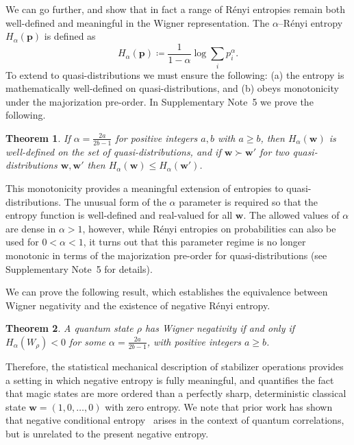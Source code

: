 \documentclass[
onecolumn,
superscriptaddress
]{revtex4-1}
\newtheorem{theorem}{Theorem}
\def\w{\boldsymbol{w}}
\def\p{\boldsymbol{p}}
\begin{document}
We can go further, and show that in fact a range of R\'{e}nyi entropies remain both well-defined and meaningful in the Wigner representation. The $\alpha$--R\'{e}nyi entropy $H_\alpha(\p)$ is defined as~\cite{renyi_1960}
\begin{equation}\label{eq:H}
	H_\alpha(\p) \coloneqq \frac{1}{1-\alpha} \log \sum_i p_i^\alpha.
\end{equation}
To extend to quasi-distributions we must ensure the following: (a) the entropy is mathematically well-defined on quasi-distributions, and (b) obeys monotonicity under the majorization pre-order. In Supplementary Note~5 we prove the following.
\begin{theorem}\label{thm:HSchur} 
	If $\alpha = \frac{2a}{2b-1}$ for positive integers $a,b$ with $a \geq b$, then $H_\alpha(\w)$ is well-defined on the set of quasi-distributions, and if $\w \succ \w'$ for two quasi-distributions $\w, \w'$ then $H_\alpha (\w) \leq H_\alpha(\w')$.
\end{theorem}
This monotonicity provides a meaningful extension of entropies to quasi-distributions. The unusual form of the $\alpha$ parameter is required so that the entropy function is well-defined and real-valued for all $\w$. The allowed values of $\alpha$ are dense in $\alpha >1$, however, while R\'{e}nyi entropies on probabilities can also be used for $0 < \alpha <1$, it turns out that this parameter regime is no longer monotonic in terms of the majorization pre-order for quasi-distributions (see Supplementary Note~5 for details).

We can prove the following result, which establishes the equivalence between Wigner negativity and the existence of negative R\'{e}nyi entropy.
\begin{theorem}\label{thm:Magic}
	A quantum state $\rho$ has Wigner negativity if and only if $H_\alpha(W_\rho) <0$ for some $\alpha = \frac{2a}{2b-1}$, with positive integers $a \ge b$.
\end{theorem}
Therefore, the statistical mechanical description of stabilizer operations provides a setting in which negative entropy is fully meaningful, and quantifies the fact that magic states are more ordered than a perfectly sharp, deterministic classical state $\w = (1,0, \dots , 0)$ with zero entropy. We note that prior work has shown that negative conditional entropy~\cite{rio_thermodynamic_2011} arises in the context of quantum correlations, but is unrelated to the present negative entropy.
\end{document}
